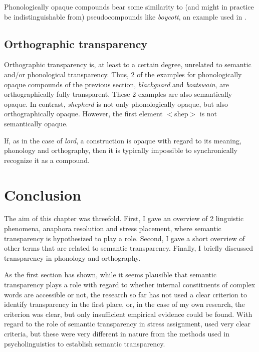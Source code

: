 \enlargethispage{1\baselineskip}
Phonologically opaque compounds bear some  similarity to (and might in practice be
indistinguishable from) pseudocompounds like
\emph{boycott}, an example used in \citet{Zwitserlood:1994}.   



\subsection{Orthographic transparency}
Orthographic transparency is, at least to a certain degree, unrelated to
semantic and/or phonological transparency. Thus, 2 of the examples for
phonologically opaque compounds of the previous section, \emph{blackguard} and
\emph{boatswain}, are orthographically
fully transparent. These 2 examples are also semantically opaque. In
contrast, \emph{shepherd} is not only phonologically opaque, but also
orthographically opaque. However, the first element $<$shep$>$ is not
semantically opaque.

If, as in the case of \emph{lord}, a construction is opaque with
regard to its meaning, phonology and orthography, then it is typically
impossible to synchronically recognize it as a compound.

\section{Conclusion}
\label{sec:con-related}

The aim of this chapter was threefold. First, I gave an overview of 2
linguistic phenomena, anaphora resolution and stress placement, where
semantic transparency is hypothesized to play a role.
Second, I gave a short overview of other terms that are related to
semantic transparency. Finally, I briefly discussed transparency in
phonology and orthography. 

As the first section has shown, while it seems plausible that semantic
transparency plays a role with regard to whether internal constituents
of complex words are accessible or not, the research so far has not
used a clear criterion to identify transparency in the first place,
or, in the case of my own research, the criterion was clear, but only
insufficient empirical evidence could be found. With regard to the role of
semantic transparency in stress assignment, \citet{Bell:2012} used
very clear criteria, but these were very different in nature from the
methods used in psycholinguistics to establish semantic transparency.

